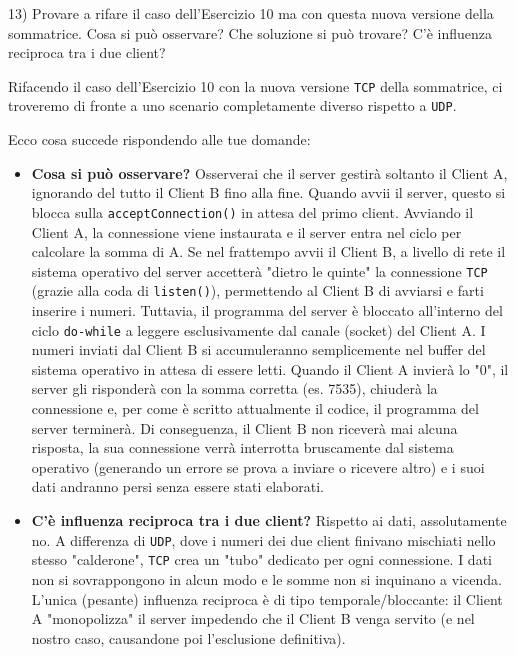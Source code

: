 \documentclass[11pt]{article}
\begin{document}
\begin{tcolorbox}[colback=blue!5!white,colframe=blue!75!black,title=\textbf{DOMANDA}, breakable]
13) Provare a rifare il caso dell'Esercizio 10 ma con questa nuova versione della sommatrice.
Cosa si può osservare? Che soluzione si può trovare? C'è influenza reciproca tra i due client?
\end{tcolorbox}

\begin{tcolorbox}[colback=green!5!white,colframe=green!75!black,title=\textbf{RISPOSTA}, breakable]
Rifacendo il caso dell'Esercizio 10 con la nuova versione \texttt{TCP} della sommatrice, ci troveremo di fronte a uno scenario completamente diverso rispetto a \texttt{UDP}.

Ecco cosa succede rispondendo alle tue domande:

\begin{itemize}
    \item \textbf{Cosa si può osservare?} Osserverai che il server gestirà soltanto il Client A, ignorando del tutto il Client B fino alla fine. Quando avvii il server, questo si blocca sulla \texttt{acceptConnection()} in attesa del primo client. Avviando il Client A, la connessione viene instaurata e il server entra nel ciclo per calcolare la somma di A. Se nel frattempo avvii il Client B, a livello di rete il sistema operativo del server accetterà "dietro le quinte" la connessione \texttt{TCP} (grazie alla coda di \texttt{listen()}), permettendo al Client B di avviarsi e farti inserire i numeri. Tuttavia, il programma del server è bloccato all'interno del ciclo \texttt{do-while} a leggere esclusivamente dal canale (socket) del Client A. I numeri inviati dal Client B si accumuleranno semplicemente nel buffer del sistema operativo in attesa di essere letti. Quando il Client A invierà lo "0", il server gli risponderà con la somma corretta (es. 7535), chiuderà la connessione e, per come è scritto attualmente il codice, il programma del server terminerà. Di conseguenza, il Client B non riceverà mai alcuna risposta, la sua connessione verrà interrotta bruscamente dal sistema operativo (generando un errore se prova a inviare o ricevere altro) e i suoi dati andranno persi senza essere stati elaborati.
    
    \item \textbf{C'è influenza reciproca tra i due client?} Rispetto ai dati, assolutamente no. A differenza di \texttt{UDP}, dove i numeri dei due client finivano mischiati nello stesso "calderone", \texttt{TCP} crea un "tubo" dedicato per ogni connessione. I dati non si sovrappongono in alcun modo e le somme non si inquinano a vicenda. L'unica (pesante) influenza reciproca è di tipo temporale/bloccante: il Client A "monopolizza" il server impedendo che il Client B venga servito (e nel nostro caso, causandone poi l'esclusione definitiva).
    

\end{itemize}
\end{tcolorbox}
\end{document}
